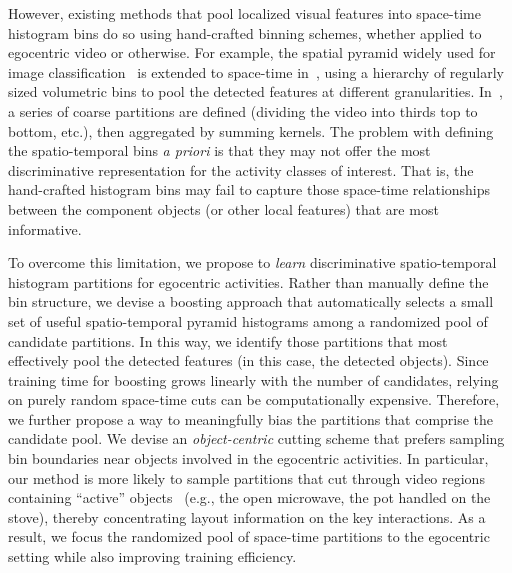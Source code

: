However, existing methods that pool localized  visual features into space-time histogram bins do so using hand-crafted binning schemes, whether applied to egocentric video or otherwise.  For example, the spatial pyramid widely used for image classification~\cite{Lazebnik06} is extended to space-time in~\cite{Choi08,Ramanan12}, using a hierarchy of regularly sized volumetric bins to pool the detected features at different granularities.  In~\cite{Laptev08}, a series of coarse partitions are defined (dividing the video into thirds top to bottom, etc.), then aggregated by summing kernels.  The problem with defining the spatio-temporal bins \emph{a priori} is that they may not offer the most discriminative representation for the activity classes of interest.  That is, the hand-crafted histogram bins may fail to capture those space-time relationships between the component objects (or other local features) that are most informative.


To overcome this limitation, we propose to \emph{learn} discriminative spatio-temporal histogram partitions for egocentric activities.  Rather than manually define the bin structure, we devise a boosting approach that automatically selects a small set of useful spatio-temporal pyramid histograms among a randomized pool of candidate partitions.  In this way, we identify those partitions that most effectively pool the detected features (in this case, the detected objects).  Since training time for boosting grows linearly with the number of candidates, relying on purely random space-time cuts can be computationally expensive.  Therefore, we further propose a way to meaningfully bias the partitions that comprise the candidate pool.  We devise an \emph{object-centric} cutting scheme that prefers sampling bin boundaries near objects involved in the egocentric activities. In particular, our method is more likely to sample partitions that cut through video regions containing ``active'' objects~\cite{Ramanan12} (e.g., the open microwave, the pot handled on the stove), thereby concentrating layout information on the key interactions.  As a result, we focus the randomized pool of space-time partitions to the egocentric setting while also improving training efficiency.

